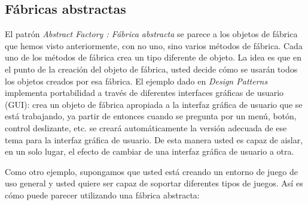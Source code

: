 \documentclass{article}
\begin{document}
\subsection{Fábricas abstractas}

El patrón \textit{Abstract Factory : Fábrica abstracta} se parece a los objetos de fábrica que hemos visto anteriormente, con no uno, sino varios métodos de fábrica. Cada uno de los métodos de fábrica crea un tipo diferente de objeto. La idea es que en el punto de la creación del objeto de fábrica, usted decide cómo se usarán todos los objetos creados por esa fábrica. El ejemplo dado en \textit{Design Patterns} implementa portabilidad a través de diferentes interfaces gráficas de usuario (GUI): crea un objeto de fábrica apropiada a la interfaz gráfica de usuario que se está trabajando, ya partir de entonces cuando se pregunta por un menú, botón, control deslizante, etc. se creará automáticamente la versión adecuada de ese tema para la interfaz gráfica de usuario. De esta manera usted es capaz de aislar, en un solo lugar, el efecto de cambiar de una interfaz gráfica de usuario a otra.     \newline

Como otro ejemplo, supongamos que usted está creando un entorno de juego de uso general y usted quiere ser capaz de soportar diferentes tipos de juegos. Así es cómo puede parecer utilizando una fábrica abstracta:     \newline
\end{document}
